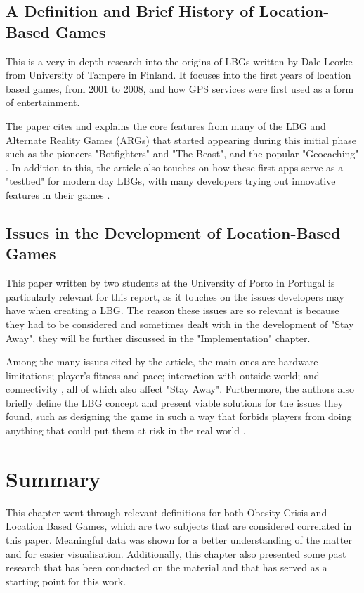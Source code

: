 \documentclass{dissertation}
\begin{document}
\subsection{A Definition and Brief History of Location-Based Games}

This is a very in depth research into the origins of LBGs written by Dale Leorke from University of Tampere in Finland. It focuses into the first years of location based games, from 
2001 to 2008, and how GPS services were first used as a form of entertainment.

The paper cites and explains the core features from many of the LBG and Alternate Reality Games (ARGs) that started appearing during this initial phase such as the pioneers 
"Botfighters" and "The Beast", and the popular "Geocaching" \citep{Leorke19}. In addition to this, the article also touches on how these first apps serve as a "testbed" for modern 
day LBGs, with many developers trying out innovative features in their games \citep{Leorke19}.

\subsection{Issues in the Development of Location-Based Games}

This paper written by two students at the University of Porto in Portugal is particularly relevant for this report, as it touches on the issues developers may have when creating a 
LBG. The reason these issues are so relevant is because they had to be considered and sometimes dealt with in the development of "Stay Away", they will be further discussed in 
the "Implementation" chapter.

Among the many issues cited by the article, the main ones are hardware limitations; player's fitness and pace; interaction with outside world; and connectivity \citep{Jacob10}, 
all of which also affect "Stay Away". Furthermore, the authors also briefly define the LBG concept and present viable solutions for the issues they found, such as designing the 
game in such a way that forbids players from doing anything that could put them at risk in the real world \citep{Jacob10}.

\section{Summary}

This chapter went through relevant definitions for both Obesity Crisis and Location Based Games, which are two subjects that are considered correlated in this paper. Meaningful 
data was shown for a better understanding of the matter and for easier visualisation. Additionally, this chapter also presented some past research that has been conducted on 
the material and that has served as a starting point for this work.
\end{document}
